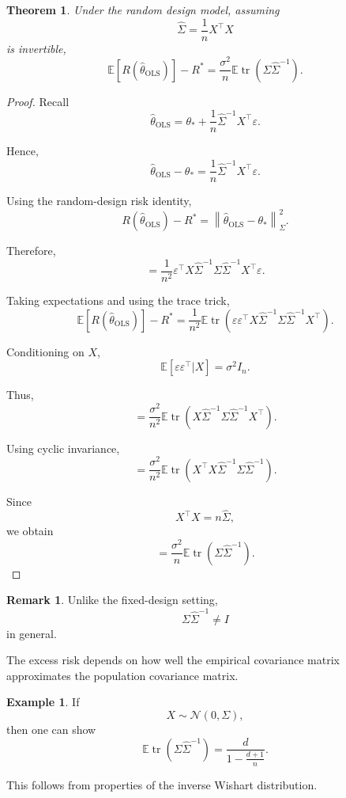 \documentclass[12pt,oneside]{book}
\numberwithin{equation}{section}
\theoremstyle{definition}
\newtheorem{example}{Example}[section]
\newtheorem{remark}{Remark}[section]
\theoremstyle{plain}
\newtheorem{theorem}{Theorem}[section]
\theoremstyle{remark}
\newcommand{\E}{\mathbb{E}}
\newcommand{\norm}[1]{\left\lVert #1 \right\rVert}
\newcommand{\tr}{\operatorname{tr}}
\newcommand{\Normal}{\mathcal{N}}
\begin{document}
\begin{theorem}
Under the random design model, assuming
\[
\widehat{\Sigma}
=
\frac{1}{n}X^\top X
\]
is invertible,
\[
\E[R(\widehat{\theta}_{\mathrm{OLS}})]-R^*
=
\frac{\sigma^2}{n}
\E\tr(\Sigma\widehat{\Sigma}^{-1}).
\]
\end{theorem}

\begin{proof}
Recall
\[
\widehat{\theta}_{\mathrm{OLS}}
=
\theta_*
+
\frac{1}{n}
\widehat{\Sigma}^{-1}X^\top\varepsilon.
\]

Hence,
\[
\widehat{\theta}_{\mathrm{OLS}}-\theta_*
=
\frac{1}{n}
\widehat{\Sigma}^{-1}X^\top\varepsilon.
\]

Using the random-design risk identity,
\[
R(\widehat{\theta}_{\mathrm{OLS}})-R^*
=
\norm{
\widehat{\theta}_{\mathrm{OLS}}-\theta_*
}_{\Sigma}^2.
\]

Therefore,
\[
=
\frac{1}{n^2}
\varepsilon^\top
X
\widehat{\Sigma}^{-1}
\Sigma
\widehat{\Sigma}^{-1}
X^\top
\varepsilon.
\]

Taking expectations and using the trace trick,
\[
\E[R(\widehat{\theta}_{\mathrm{OLS}})]-R^*
=
\frac{1}{n^2}
\E\tr\left(
\varepsilon\varepsilon^\top
X
\widehat{\Sigma}^{-1}
\Sigma
\widehat{\Sigma}^{-1}
X^\top
\right).
\]

Conditioning on $X$,
\[
\E[\varepsilon\varepsilon^\top|X]
=
\sigma^2I_n.
\]

Thus,
\[
=
\frac{\sigma^2}{n^2}
\E\tr\left(
X
\widehat{\Sigma}^{-1}
\Sigma
\widehat{\Sigma}^{-1}
X^\top
\right).
\]

Using cyclic invariance,
\[
=
\frac{\sigma^2}{n^2}
\E\tr\left(
X^\top X
\widehat{\Sigma}^{-1}
\Sigma
\widehat{\Sigma}^{-1}
\right).
\]

Since
\[
X^\top X=n\widehat{\Sigma},
\]
we obtain
\[
=
\frac{\sigma^2}{n}
\E\tr(\Sigma\widehat{\Sigma}^{-1}).
\]
\end{proof}

\begin{remark}
Unlike the fixed-design setting,
\[
\Sigma\widehat{\Sigma}^{-1}\neq I
\]
in general.

The excess risk depends on how well the empirical covariance matrix approximates the population covariance matrix.
\end{remark}

\begin{example}
If
\[
X\sim \Normal(0,\Sigma),
\]
then one can show
\[
\E\tr(\Sigma\widehat{\Sigma}^{-1})
=
\frac{d}{1-\frac{d+1}{n}}.
\]

This follows from properties of the inverse Wishart distribution.
\end{example}
\end{document}
